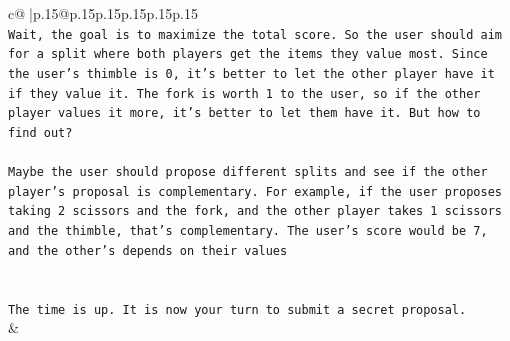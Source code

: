 \documentclass{article}
\begin{document}
{\begin{supertabular}{c@{$\;$}|p{.15\linewidth}@{}p{.15\linewidth}p{.15\linewidth}p{.15\linewidth}p{.15\linewidth}p{.15\linewidth}}
{{{\\ 
\texttt{Wait, the goal is to maximize the total score. So the user should aim for a split where both players get the items they value most. Since the user's thimble is 0, it's better to let the other player have it if they value it. The fork is worth 1 to the user, so if the other player values it more, it's better to let them have it. But how to find out?} \\
\\ 
\texttt{Maybe the user should propose different splits and see if the other player's proposal is complementary. For example, if the user proposes taking 2 scissors and the fork, and the other player takes 1 scissors and the thimble, that's complementary. The user's score would be 7, and the other's depends on their values} \\
\\ 
\\ 
\texttt{The time is up. It is now your turn to submit a secret proposal.} \\
            }
        }
    }
    & \\ \\


\end{supertabular}}
\end{document}
